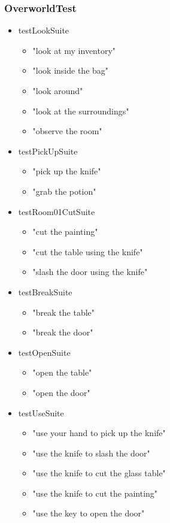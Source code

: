 \documentclass[11pt]{article}
\begin{document}
\subsubsection{OverworldTest}
\begin{scriptsize}
\begin{itemize}
\item testLookSuite
	\begin{itemize}
	\item "look at my inventory"
	\item "look inside the bag"
	\item "look around"
	\item "look at the surroundings"
	\item "observe the room"
	\end{itemize}
\item testPickUpSuite
	\begin{itemize}
	\item "pick up the knife"
	\item "grab the potion"
	\end{itemize}
\item testRoom01CutSuite
	\begin{itemize}
	\item "cut the painting"
	\item "cut the table using the knife"
	\item "slash the door using the knife"
	\end{itemize}
\item testBreakSuite
	\begin{itemize}
	\item "break the table"
	\item "break the door"
	\end{itemize}
\item testOpenSuite
	\begin{itemize}
	\item "open the table"
	\item "open the door"
	\end{itemize}
\item testUseSuite
	\begin{itemize}
	\item "use your hand to pick up the knife"
	\item "use the knife to slash the door"
	\item "use the knife to cut the glass table"
	\item "use the knife to cut the painting"
	\item "use the key to open the door"

\end{itemize}
\end{itemize}
\end{scriptsize}
\end{document}
